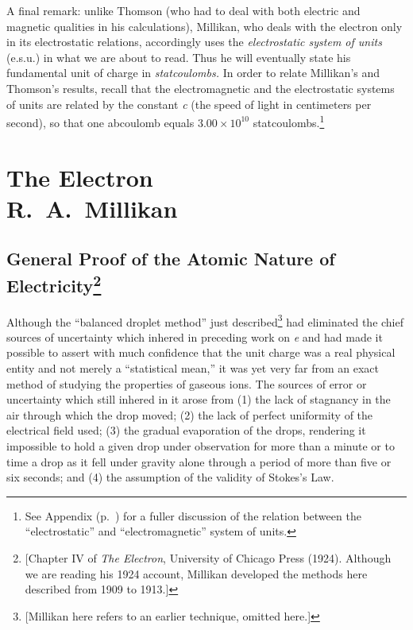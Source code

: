 A final remark: unlike Thomson (who had to deal with both electric and
magnetic qualities in his calculations), Millikan, who deals with the
electron only in its e\-lec\-tro\-stat\-ic relations, accordingly uses the
\emph{e\-lec\-tro\-stat\-ic system of units} (e.s.u.) in what we are about to
read. Thus he will eventually state his fundamental unit of charge in
\emph{stat\-cou\-lombs.} In order to relate Millikan's and Thomson's
results, recall that the electromagnetic and the e\-lec\-tro\-stat\-ic systems
of units are related by the constant \emph{c} (the speed of light in 
centimeters per second), so that one abcoulomb
equals $3.00 \times 10^{10}$ stat\-cou\-lombs.\footnote{See Appendix (p.~\pageref{ch:appendix})
for a fuller discussion of the relation between the ``e\-lec\-tro\-stat\-ic''
and ``electromagnetic'' system of units.}

\section*{The Electron\\ {\large R.\ A.\ Millikan}}

\subsection*{General Proof of the Atomic Nature of Electricity\footnote{[Chapter IV of \emph{The Electron}, University of
  Chicago Press (1924). Although we are reading his 1924 account,
  Millikan developed the methods here described from 1909 to 1913.]}}


Although the ``balanced droplet method'' just described\footnote{{[}Millikan
  here refers to an earlier technique, omitted here.{]}} had eliminated
the chief sour\-ces of uncertainty which inhered in preceding work on
\emph{e} and had made it possible to assert with much confidence that
the unit charge was a real physical entity and not merely a
``statistical mean,'' it was yet very far from an exact method of
studying the properties of gaseous ions. The sour\-ces of error or
uncertainty which still inhered in it arose from (1) the lack of
stagnancy in the air through which the drop moved; (2) the lack of
perfect uniformity of the electrical field used; (3) the gradual
evaporation of the drops, rendering it impossible to hold a given drop
under observation for more than a minute or to time a drop as it fell
under gravity alone through a period of more than five or six seconds;
and (4) the assumption of the validity of Stokes's Law.

